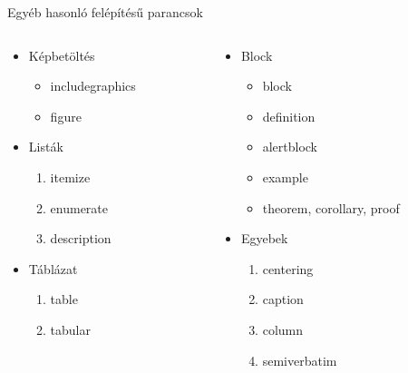 \documentclass[11pt]{beamer}
\begin{document}
\begin{frame}{Egyéb hasonló felépítésű parancsok}
\label{parancsok}
\begin{columns}

	\begin{column}{0.5\textwidth}
		\begin{itemize}
			\item Képbetöltés
			\begin{itemize}
				\item includegraphics
				\item figure
			\end{itemize}
			\item Listák
			\begin{enumerate}
				\item itemize
				\item enumerate
				\item description
			\end{enumerate}
			\item Táblázat
			\begin{enumerate}[I]
				\item table
				\item tabular
			\end{enumerate}
		\end{itemize}
	\end{column}

	\begin{column}{0.5\textwidth}
		\begin{itemize}
			\item Block
			\begin{itemize}
				\item block
				\item definition
				\item alertblock
				\item example
				\item theorem, corollary, proof
			\end{itemize}					
			\item Egyebek
			\begin{enumerate}[i]
				\item centering
				\item caption
				\item column
				\item semiverbatim
			\end{enumerate}
		\end{itemize}
	\end{column}

\end{columns}
\end{frame}
\end{document}
